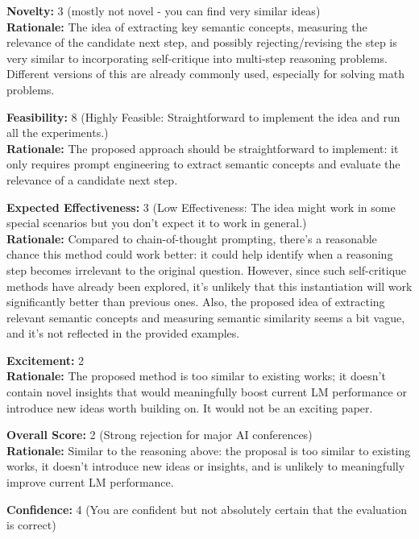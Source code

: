 \vspace{20pt}

\begin{tcolorbox}[colback=green!10!white, colframe=green!80!black, title=\textbf{Reviewer 3}]
\small
\textbf{Novelty:} 3 (mostly not novel - you can find very similar ideas)\\
\textbf{Rationale:} The idea of extracting key semantic concepts, measuring the relevance of the candidate next step, and possibly rejecting/revising the step is very similar to incorporating self-critique into multi-step reasoning problems. Different versions of this are already commonly used, especially for solving math problems.

\vspace{10pt}

\textbf{Feasibility:} 8 (Highly Feasible: Straightforward to implement the idea and run all the experiments.)\\
\textbf{Rationale:} The proposed approach should be straightforward to implement: it only requires prompt engineering to extract semantic concepts and evaluate the relevance of a candidate next step.

\vspace{10pt}

\textbf{Expected Effectiveness:} 3 (Low Effectiveness: The idea might work in some special scenarios but you don't expect it to work in general.)\\
\textbf{Rationale:} Compared to chain-of-thought prompting, there's a reasonable chance this method could work better: it could help identify when a reasoning step becomes irrelevant to the original question. However, since such self-critique methods have already been explored, it's unlikely that this instantiation will work significantly better than previous ones. Also, the proposed idea of extracting relevant semantic concepts and measuring semantic similarity seems a bit vague, and it's not reflected in the provided examples.

\vspace{10pt}

\textbf{Excitement:} 2\\
\textbf{Rationale:} The proposed method is too similar to existing works; it doesn't contain novel insights that would meaningfully boost current LM performance or introduce new ideas worth building on. It would not be an exciting paper.

\vspace{10pt}

\textbf{Overall Score:} 2 (Strong rejection for major AI conferences)\\
\textbf{Rationale:} Similar to the reasoning above: the proposal is too similar to existing works, it doesn't introduce new ideas or insights, and is unlikely to meaningfully improve current LM performance.

\vspace{10pt}

\textbf{Confidence:} 4 (You are confident but not absolutely certain that the evaluation is correct)
\end{tcolorbox}




